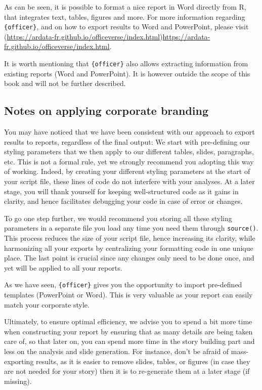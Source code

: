 \documentclass[
]{krantz}
\renewenvironment{quote}{\begin{VF}}{\end{VF}}
\begin{document}
As can be seen, it is possible to format a nice report in Word directly from R, that integrates text, tables, figures and more. For more information regarding \texttt{\{officer\}}, and on how to export results to Word and PowerPoint, please visit (\url{https://ardata-fr.github.io/officeverse/index.html})\url{https://ardata-fr.github.io/officeverse/index.html}.

\begin{quote}
It is worth mentioning that \texttt{\{officer\}} also allows extracting information from existing reports (Word and PowerPoint). It is however outside the scope of this book and will not be further described.
\end{quote}

\hypertarget{notes-on-applying-corporate-branding}{%
\subsection{Notes on applying corporate branding}\label{notes-on-applying-corporate-branding}}

You may have noticed that we have been consistent with our approach to export results to reports, regardless of the final output:
We start with pre-defining our styling parameters that we then apply to our different tables, slides, paragraphs, etc. This is not a formal rule, yet we strongly recommend you adopting this way of working. Indeed, by creating your different styling parameters at the start of your script file, these lines of code do not interfere with your analyses. At a later stage, you will thank yourself for keeping well-structured code as it gains in clarity, and hence facilitates debugging your code in case of error or changes.

To go one step further, we would recommend you storing all these styling parameters in a separate file you load any time you need them through \texttt{source()}. This process reduces the size of your script file, hence increasing its clarity, while harmonizing all your exports by centralizing your formatting code in one unique place. The last point is crucial since any changes only need to be done once, and yet will be applied to all your reports.

As we have seen, \texttt{\{officer\}} gives you the opportunity to import pre-defined templates (PowerPoint or Word). This is very valuable as your report can easily match your corporate style.

Ultimately, to ensure optimal efficiency, we advise you to spend a bit more time when constructing your report by ensuring that as many details are being taken care of, so that later on, you can spend more time in the story building part and less on the analysis and slide generation. For instance, don't be afraid of mass-exporting results, as it is easier to remove slides, tables, or figures (in case they are not needed for your story) then it is to re-generate them at a later stage (if missing).
\end{document}
